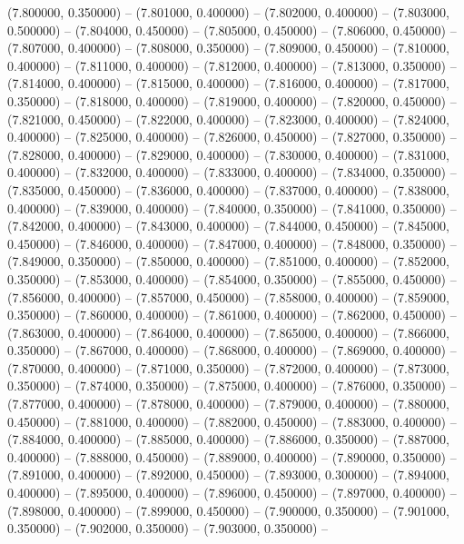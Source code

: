 (7.800000, 0.350000) -- 
(7.801000, 0.400000) -- 
(7.802000, 0.400000) -- 
(7.803000, 0.500000) -- 
(7.804000, 0.450000) -- 
(7.805000, 0.450000) -- 
(7.806000, 0.450000) -- 
(7.807000, 0.400000) -- 
(7.808000, 0.350000) -- 
(7.809000, 0.450000) -- 
(7.810000, 0.400000) -- 
(7.811000, 0.400000) -- 
(7.812000, 0.400000) -- 
(7.813000, 0.350000) -- 
(7.814000, 0.400000) -- 
(7.815000, 0.400000) -- 
(7.816000, 0.400000) -- 
(7.817000, 0.350000) -- 
(7.818000, 0.400000) -- 
(7.819000, 0.400000) -- 
(7.820000, 0.450000) -- 
(7.821000, 0.450000) -- 
(7.822000, 0.400000) -- 
(7.823000, 0.400000) -- 
(7.824000, 0.400000) -- 
(7.825000, 0.400000) -- 
(7.826000, 0.450000) -- 
(7.827000, 0.350000) -- 
(7.828000, 0.400000) -- 
(7.829000, 0.400000) -- 
(7.830000, 0.400000) -- 
(7.831000, 0.400000) -- 
(7.832000, 0.400000) -- 
(7.833000, 0.400000) -- 
(7.834000, 0.350000) -- 
(7.835000, 0.450000) -- 
(7.836000, 0.400000) -- 
(7.837000, 0.400000) -- 
(7.838000, 0.400000) -- 
(7.839000, 0.400000) -- 
(7.840000, 0.350000) -- 
(7.841000, 0.350000) -- 
(7.842000, 0.400000) -- 
(7.843000, 0.400000) -- 
(7.844000, 0.450000) -- 
(7.845000, 0.450000) -- 
(7.846000, 0.400000) -- 
(7.847000, 0.400000) -- 
(7.848000, 0.350000) -- 
(7.849000, 0.350000) -- 
(7.850000, 0.400000) -- 
(7.851000, 0.400000) -- 
(7.852000, 0.350000) -- 
(7.853000, 0.400000) -- 
(7.854000, 0.350000) -- 
(7.855000, 0.450000) -- 
(7.856000, 0.400000) -- 
(7.857000, 0.450000) -- 
(7.858000, 0.400000) -- 
(7.859000, 0.350000) -- 
(7.860000, 0.400000) -- 
(7.861000, 0.400000) -- 
(7.862000, 0.450000) -- 
(7.863000, 0.400000) -- 
(7.864000, 0.400000) -- 
(7.865000, 0.400000) -- 
(7.866000, 0.350000) -- 
(7.867000, 0.400000) -- 
(7.868000, 0.400000) -- 
(7.869000, 0.400000) -- 
(7.870000, 0.400000) -- 
(7.871000, 0.350000) -- 
(7.872000, 0.400000) -- 
(7.873000, 0.350000) -- 
(7.874000, 0.350000) -- 
(7.875000, 0.400000) -- 
(7.876000, 0.350000) -- 
(7.877000, 0.400000) -- 
(7.878000, 0.400000) -- 
(7.879000, 0.400000) -- 
(7.880000, 0.450000) -- 
(7.881000, 0.400000) -- 
(7.882000, 0.450000) -- 
(7.883000, 0.400000) -- 
(7.884000, 0.400000) -- 
(7.885000, 0.400000) -- 
(7.886000, 0.350000) -- 
(7.887000, 0.400000) -- 
(7.888000, 0.450000) -- 
(7.889000, 0.400000) -- 
(7.890000, 0.350000) -- 
(7.891000, 0.400000) -- 
(7.892000, 0.450000) -- 
(7.893000, 0.300000) -- 
(7.894000, 0.400000) -- 
(7.895000, 0.400000) -- 
(7.896000, 0.450000) -- 
(7.897000, 0.400000) -- 
(7.898000, 0.400000) -- 
(7.899000, 0.450000) -- 
(7.900000, 0.350000) -- 
(7.901000, 0.350000) -- 
(7.902000, 0.350000) -- 
(7.903000, 0.350000) -- 
